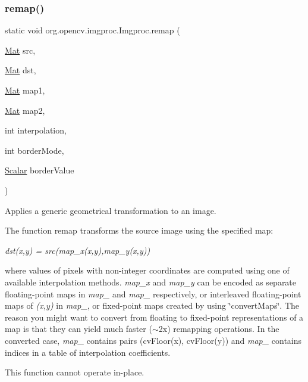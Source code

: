 \subsubsection{\texorpdfstring{remap()}{remap()}\hspace{0.1cm}{\footnotesize\ttfamily [1/2]}}
{\footnotesize\ttfamily static void org.\+opencv.\+imgproc.\+Imgproc.\+remap (\begin{DoxyParamCaption}\item[{\mbox{\hyperlink{classorg_1_1opencv_1_1core_1_1_mat}{Mat}}}]{src,  }\item[{\mbox{\hyperlink{classorg_1_1opencv_1_1core_1_1_mat}{Mat}}}]{dst,  }\item[{\mbox{\hyperlink{classorg_1_1opencv_1_1core_1_1_mat}{Mat}}}]{map1,  }\item[{\mbox{\hyperlink{classorg_1_1opencv_1_1core_1_1_mat}{Mat}}}]{map2,  }\item[{int}]{interpolation,  }\item[{int}]{border\+Mode,  }\item[{\mbox{\hyperlink{classorg_1_1opencv_1_1core_1_1_scalar}{Scalar}}}]{border\+Value }\end{DoxyParamCaption})\hspace{0.3cm}{\ttfamily [static]}}

Applies a generic geometrical transformation to an image.

The function {\ttfamily remap} transforms the source image using the specified map\+:

{\itshape dst(x,y) = src(map\+\_\+x(x,y),map\+\_\+y(x,y))}

where values of pixels with non-\/integer coordinates are computed using one of available interpolation methods. {\itshape map\+\_\+x} and {\itshape map\+\_\+y} can be encoded as separate floating-\/point maps in {\itshape map\+\_} and {\itshape map\+\_} respectively, or interleaved floating-\/point maps of {\itshape (x,y)} in {\itshape map\+\_}, or fixed-\/point maps created by using \char`\"{}convert\+Maps\char`\"{}. The reason you might want to convert from floating to fixed-\/point representations of a map is that they can yield much faster ($\sim$2x) remapping operations. In the converted case, {\itshape map\+\_} contains pairs {\ttfamily (cv\+Floor(x), cv\+Floor(y))} and {\itshape map\+\_} contains indices in a table of interpolation coefficients.

This function cannot operate in-\/place.


